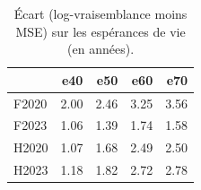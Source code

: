 \begin{table}[htbp]
\caption{Écart (log-vraisemblance moins MSE) sur les espérances de vie (en années).}
\label{tab:ecart_esp}
\begin{tabular}{lrrrr}
\toprule
 & e40 & e50 & e60 & e70 \\
\midrule
F2020 & 2.00 & 2.46 & 3.25 & 3.56 \\
F2023 & 1.06 & 1.39 & 1.74 & 1.58 \\
H2020 & 1.07 & 1.68 & 2.49 & 2.50 \\
H2023 & 1.18 & 1.82 & 2.72 & 2.78 \\
\bottomrule
\end{tabular}
\end{table}
